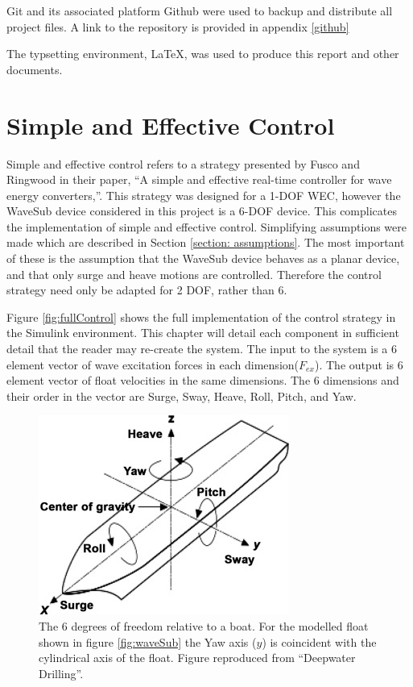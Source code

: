 \documentclass{report}
\begin{document}
Git and its associated platform Github were used to backup and distribute all project files. A link to the repository is provided in appendix \ref{github}

The typsetting environment, \LaTeX , was used to produce this report and other documents.
\chapter{Simple and Effective Control}
Simple and effective control refers to a strategy presented by Fusco and Ringwood in their paper, ``A simple and effective real-time controller for wave energy converters,''\cite{ringwood}. This strategy was designed for a 1-DOF WEC, however the WaveSub device considered in this project is a 6-DOF device. This complicates the implementation of simple and effective control. Simplifying assumptions were made which are described in Section \ref{section: assumptions}. The most important of these is the assumption that the WaveSub device behaves as a planar device, and that only surge and heave motions are controlled. Therefore the control strategy need only be adapted for 2 DOF, rather than 6.

Figure \ref{fig:fullControl} shows the full implementation of the control strategy in the Simulink environment. This chapter will detail each component in sufficient detail that the reader may re-create the system. The input to the system is a 6 element vector of wave excitation forces in each dimension($F_{ex}$). The output is 6 element vector of float velocities in the same dimensions. The 6 dimensions and their order in the vector are Surge, Sway, Heave, Roll, Pitch, and Yaw.

\begin{figure}[b]
\includegraphics{graphics/dimensionsPic}
\centering
\caption{The 6 degrees of freedom relative to a boat. For the modelled float shown in figure \ref{fig:waveSub} the Yaw axis ($y$) is coincident with the cylindrical axis of the float. Figure reproduced from ``Deepwater Drilling''\cite{dimensionsPic}.}
\label{dimensionsPic}
\end{figure}
\end{document}
